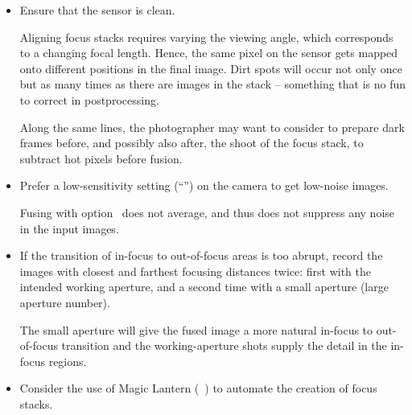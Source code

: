 \begin{itemize}
\item
  Ensure that the sensor is clean.

  Aligning focus stacks requires varying the viewing angle, which corresponds to a changing
  focal length.  Hence, the same pixel on the sensor gets mapped onto different positions in the
  final image.  Dirt spots will occur not only once but as many times as there are images in the
  stack -- something that is no fun to correct in postprocessing.

  Along the same lines, the photographer may want to consider to prepare dark frames before, and
  possibly also after, the shoot of the focus stack, to subtract hot pixels before fusion.

\item
  Prefer a low-sensitivity setting (``'') on the camera to get low-noise images.

  Fusing with option~ does not average, and thus does
  not suppress any noise in the input images.

\item
  If the transition of in-focus to out-of-focus areas is too abrupt, record the images with
  closest and farthest focusing distances twice: first with the intended working aperture, and a
  second time with a small aperture (large aperture number).

  The small aperture will give the fused image a more natural in-focus to out-of-focus
  transition and the working-aperture shots supply the detail in the in-focus regions.

\item
  Consider the use of Magic Lantern (\appendixName~) to automate the
  creation of focus stacks.
\end{itemize}




